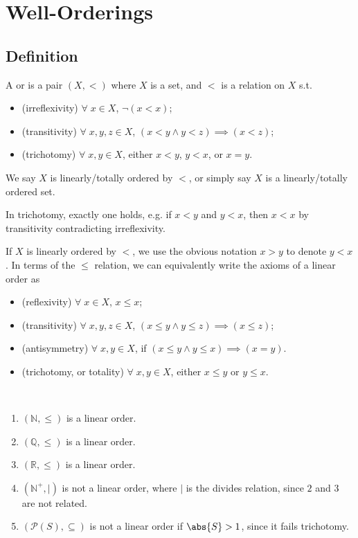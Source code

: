 \section{Well-Orderings}
\subsection{Definition}

\begin{definition}
    A  or  is a pair $(X, <)$ where $X$ is a set, and $<$ is a relation on $X$ s.t.
    \begin{itemize}
        \item (irreflexivity) $\forall \; x \in X$, $\neg(x < x)$;
        \item (transitivity) $\forall \; x, y, z \in X$, $(x < y \wedge y < z) \implies (x < z)$;
        \item (trichotomy) $\forall \; x, y \in X$, either $x < y$, $y < x$, or $x = y$.
    \end{itemize}
    We say $X$ is linearly/totally ordered by $<$, or simply say $X$ is a linearly/totally ordered set.
\end{definition}

\begin{note}
    In trichotomy, exactly one holds, e.g. if $x < y$ and $y < x$, then $x < x$ by transitivity contradicting irreflexivity.
\end{note}

If $X$ is linearly ordered by $<$, we use the obvious notation $x > y$ to denote $y < x$.
In terms of the $\leq$ relation, we can equivalently write the axioms of a linear order as
\begin{itemize}
    \item (reflexivity) $\forall \; x \in X$, $x \leq x$;
    \item (transitivity) $\forall \; x, y, z \in X$, $(x \leq y \wedge y \leq z) \implies (x \leq z)$;
    \item (antisymmetry) $\forall \; x, y \in X$, if $(x \leq y \wedge y \leq x) \implies (x = y)$.
    \item (trichotomy, or totality) $\forall \; x, y \in X$, either $x \leq y$ or $y \leq x$.
\end{itemize}

\begin{example} ~\vspace*{-1.5\baselineskip}
    \begin{enumerate}
        \item $(\mathbb N, \leq)$ is a linear order.
        \item $(\mathbb Q, \leq)$ is a linear order.
        \item $(\mathbb R, \leq)$ is a linear order.
        \item $(\mathbb N^+, |)$ is not a linear order, where $|$ is the divides relation, since $2$ and $3$ are not related.
        \item $(\mathcal P(S), \subseteq)$ is not a linear order if $\abs{S} > 1$, since it fails trichotomy.
    \end{enumerate}
\end{example}

